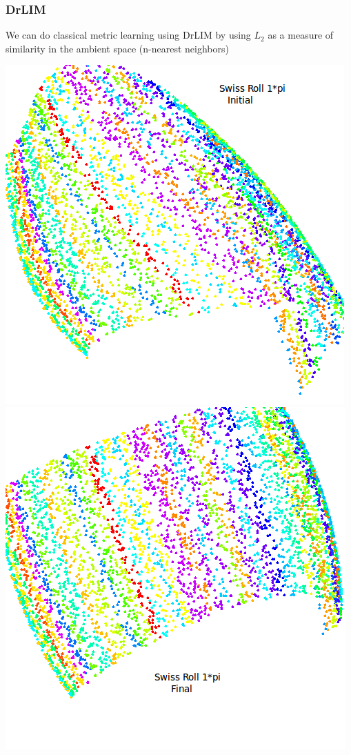 \documentclass{beamer}
\begin{document}
\begin{frame}
\frametitle{DrLIM}
We can do classical metric learning using DrLIM by using $L_2$ as a measure of similarity in the ambient space (n-nearest neighbors)
\begin{center}
\includegraphics[scale = 0.20]{s1.png} 
\includegraphics[scale = 0.20]{s2.png} \\

\end{center}
\end{frame}
\end{document}
